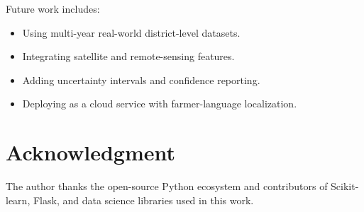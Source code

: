 \documentclass[conference]{IEEEtran}
\begin{document}
Future work includes:
\begin{itemize}
    \item Using multi-year real-world district-level datasets.
    \item Integrating satellite and remote-sensing features.
    \item Adding uncertainty intervals and confidence reporting.
    \item Deploying as a cloud service with farmer-language localization.
\end{itemize}

\section*{Acknowledgment}
The author thanks the open-source Python ecosystem and contributors of Scikit-learn, Flask, and data science libraries used in this work.



\end{document}
